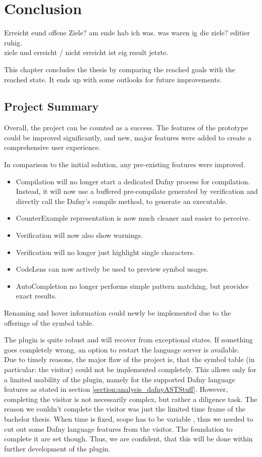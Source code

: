 \section{Conclusion}
\label{section:conclusion}
Erreicht eund offene Ziele? am ende hab ich was. was waren ig die ziele? editier ruhig. \\
ziele und erreicht / nicht erreicht ist eig result jetzte.


This chapter concludes the thesis by comparing the reached goals with the reached state.
It ends up with some outlooks for future improvements.

\subsection{Project Summary}
Overall, the project can be counted as a success.
The features of the prototype could be improved significantly, and new, major features were added to create a comprehensive user experience.

In comparison to the initial solution, any pre-existing features were improved.
\begin{itemize}
 \item Compilation will no longer start a dedicated Dafny process for compilation. Instead, it will now use a buffered pre-compilate generated by verification and directly call the Dafny's compile method, to generate an executable.
 \item CounterExample representation is now much cleaner and easier to perceive.
 \item Verification will now also show warnings.
 \item Verification will no longer just highlight single characters.
 \item CodeLens can now actively be used to preview symbol usages.
 \item AutoCompletion no longer performs simple pattern matching, but provides exact results.
\end{itemize}
Renaming and hover information could newly be implemented due to the offerings of the symbol table.

The plugin is quite robust and will recover from exceptional states.
If something goes completely wrong, an option to restart the language server is available.\\

Due to timely reasons, the major flaw of the project is, that the symbol table (in particular: the visitor) could not be implemented completely.
This allows only for a limited usability of the plugin, namely for the supported Dafny language features as stated in section \ref{section:analysis_dafnyASTStuff}.
However, completing the visitor is not necessarily complex, but rather a diligence task.
The reason we couldn't complete the visitor was just the limited time frame of the bachelor thesis.
When time is fixed, scope has to be variable \cite{keller}, thus we needed to cut out some Dafny language features from the visitor.
The foundation to complete it are set though.
Thus, we are confident, that this will be done within further development of the plugin.\\

